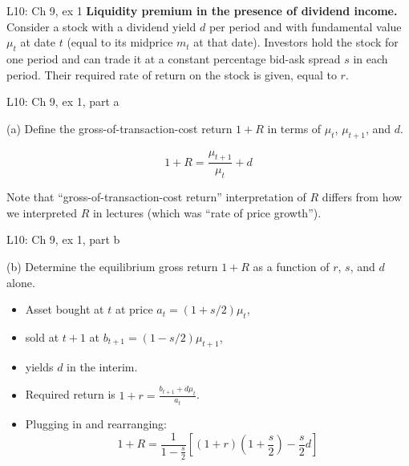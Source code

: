 \documentclass[english,10pt
,aspectratio=169
]{beamer}
\begin{document}
\begin{frame}{L10: Ch 9, ex 1}
	\textbf{Liquidity premium in the presence of dividend income.}
	Consider a stock with a dividend yield $d$ per period and with fundamental
	value $\mu _{t}$ at date $t$ (equal to its midprice $m_{t}$ at that date).
	Investors hold the stock for one period and can trade it at a constant
	percentage bid-ask spread $s$ in each period. Their required rate of return
	on the stock is given, equal to $r$.
\end{frame}


\begin{frame}{L10: Ch 9, ex 1, part a}
	\begin{exampleblock}{}
		(a) Define the gross-of-transaction-cost return $1+R$ in terms of $\mu _{t}$, $\mu _{t+1}$, and $d$.
	\end{exampleblock}
	
	\pause
	
	\[ 1+R = \frac{\mu_{t+1}}{\mu_t} + d \]
	
	Note that ``gross-of-transaction-cost return'' interpretation of $R$ differs from how we interpreted $R$ in lectures (which was ``rate of price growth'').
\end{frame}


\begin{frame}{L10: Ch 9, ex 1, part b}
	\begin{exampleblock}{}
		(b) Determine the equilibrium gross return $1+R$ as a function of $r$, $s$, and $d$ alone.
	\end{exampleblock}
	
	\pause
	
	\begin{itemize}
		\item Asset bought at $t$ at price $a_t = (1 + s/2) \mu_t$,
		\item sold at $t+1$ at $b_{t+1} = (1 - s/2) \mu_{t+1}$,
		\item yields $d$ in the interim.
		\item Required return is $1 + r = \frac{b_{t+1} + d \mu_t}{a_t}$.
		\item Plugging in and rearranging:
		\[ 1+R = \frac{1}{1-\frac{s}{2}} \left[ (1+r)\left(1+\frac{s}{2}\right) - \frac{s}{2} d \right] \]
	\end{itemize}
\end{frame}
\end{document}
